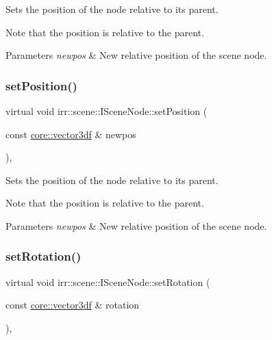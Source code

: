 Sets the position of the node relative to its parent. 

Note that the position is relative to the parent. 
\begin{DoxyParams}{Parameters}
{\em newpos} & New relative position of the scene node. \\
\hline
\end{DoxyParams}
\mbox{\label{classirr_1_1scene_1_1ISceneNode_a2166eb0a92cc0e46c49266f41a68ed50}} 
\subsubsection{\texorpdfstring{set\+Position()}{setPosition()}\hspace{0.1cm}{\footnotesize\ttfamily [2/2]}}
{\footnotesize\ttfamily virtual void irr\+::scene\+::\+I\+Scene\+Node\+::set\+Position (\begin{DoxyParamCaption}\item[{const \hyperlink{namespaceirr_1_1core_ae6e2b2a6c552833ebbd5b7463d03586b}{core\+::vector3df} \&}]{newpos }\end{DoxyParamCaption})\hspace{0.3cm}{\ttfamily [inline]}, {\ttfamily [virtual]}}



Sets the position of the node relative to its parent. 

Note that the position is relative to the parent. 
\begin{DoxyParams}{Parameters}
{\em newpos} & New relative position of the scene node. \\
\hline
\end{DoxyParams}
\mbox{\label{classirr_1_1scene_1_1ISceneNode_adb6ff54f52d3a9e1514cd487a550935c}} 
\subsubsection{\texorpdfstring{set\+Rotation()}{setRotation()}\hspace{0.1cm}{\footnotesize\ttfamily [1/2]}}
{\footnotesize\ttfamily virtual void irr\+::scene\+::\+I\+Scene\+Node\+::set\+Rotation (\begin{DoxyParamCaption}\item[{const \hyperlink{namespaceirr_1_1core_ae6e2b2a6c552833ebbd5b7463d03586b}{core\+::vector3df} \&}]{rotation }\end{DoxyParamCaption})\hspace{0.3cm}{\ttfamily [inline]}, {\ttfamily [virtual]}}




